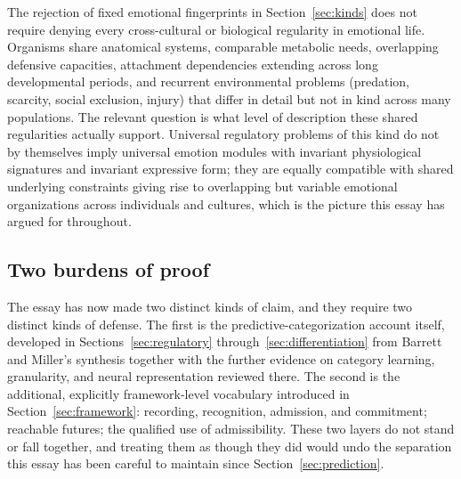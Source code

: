 \documentclass[11pt]{article}
\begin{document}
The rejection of fixed emotional fingerprints in Section~\ref{sec:kinds} does not require denying every cross-cultural or biological regularity in emotional life. Organisms share anatomical systems, comparable metabolic needs, overlapping defensive capacities, attachment dependencies extending across long developmental periods, and recurrent environmental problems (predation, scarcity, social exclusion, injury) that differ in detail but not in kind across many populations. The relevant question is what level of description these shared regularities actually support. Universal regulatory problems of this kind do not by themselves imply universal emotion modules with invariant physiological signatures and invariant expressive form; they are equally compatible with shared underlying constraints giving rise to overlapping but variable emotional organizations across individuals and cultures, which is the picture this essay has argued for throughout.

\subsection{Two burdens of proof}\label{sub:burdens}

The essay has now made two distinct kinds of claim, and they require two distinct kinds of defense. The first is the predictive-categorization account itself, developed in Sections~\ref{sec:regulatory} through~\ref{sec:differentiation} from Barrett and Miller's synthesis together with the further evidence on category learning, granularity, and neural representation reviewed there. The second is the additional, explicitly framework-level vocabulary introduced in Section~\ref{sec:framework}: recording, recognition, admission, and commitment; reachable futures; the qualified use of admissibility. These two layers do not stand or fall together, and treating them as though they did would undo the separation this essay has been careful to maintain since Section~\ref{sec:prediction}.
\end{document}
